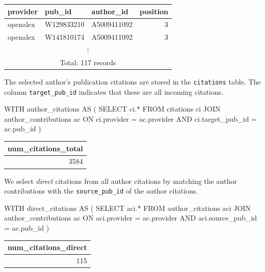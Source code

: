 \begin{center}
    \begin{tabular}{|l|l|l|r|}
        \hline
        provider & pub\_id & author\_id & position \\
        \hline\hline
        openalex & W129833210 & A5009411092 & 3 \\
        openalex & W141810174 & A5009411092 & 3 \\
        \multicolumn{4}{|c|}{$\vdots$} \\
        \multicolumn{4}{|c|}{Total: 117 records} \\
        \hline
    \end{tabular}
\end{center}

The selected author's publication citations are stored in the \texttt{citations} table.
The column \texttt{target\_pub\_id} indicates that these are all incoming citations.

\begin{SQLcode}
WITH author_citations AS (
    SELECT ci.*
    FROM citations ci
        JOIN author_contributions ac
            ON ci.provider = ac.provider
                AND ci.target_pub_id = ac.pub_id
)
\end{SQLcode}

\begin{center}
    \begin{tabular}{|r|}
        \hline
        num\_citations\_total \\
        \hline\hline
        3584 \\
        \hline
    \end{tabular}
\end{center}

We select \emph{direct} citations from all author citations by matching the author contributions with the \texttt{source\_pub\_id} of the author citations.

\begin{SQLcode}
WITH direct_citations AS (
    SELECT aci.*
    FROM author_citations aci
        JOIN author_contributions ac
            ON aci.provider = ac.provider
                AND aci.source_pub_id = ac.pub_id
)
\end{SQLcode}

\begin{center}
    \begin{tabular}{|r|}
        \hline
        num\_citations\_direct \\
        \hline\hline
        115 \\
        \hline
    \end{tabular}
\end{center}


